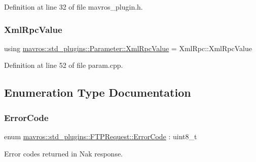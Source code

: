Definition at line 32 of file mavros\+\_\+plugin.\+h.

\mbox{\label{group__plugin_gafe570e1ad21e55964c02084e1a485c92}} 
\subsubsection{\texorpdfstring{XmlRpcValue}{XmlRpcValue}}
{\footnotesize\ttfamily using \mbox{\hyperlink{group__plugin_gafe570e1ad21e55964c02084e1a485c92}{mavros\+::std\+\_\+plugins\+::\+Parameter\+::\+Xml\+Rpc\+Value}} =  Xml\+Rpc\+::\+Xml\+Rpc\+Value}



Definition at line 52 of file param.\+cpp.



\subsection{Enumeration Type Documentation}
\mbox{\label{group__plugin_ga6a8ced5d703e3cd6216c5042e9eaa67e}} 
\subsubsection{\texorpdfstring{ErrorCode}{ErrorCode}}
{\footnotesize\ttfamily enum \mbox{\hyperlink{group__plugin_ga6a8ced5d703e3cd6216c5042e9eaa67e}{mavros\+::std\+\_\+plugins\+::\+F\+T\+P\+Request\+::\+Error\+Code}} \+: uint8\+\_\+t}



Error codes returned in Nak response. 

